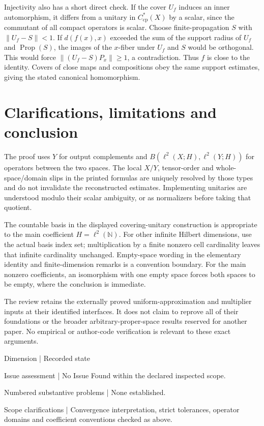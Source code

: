 \documentclass[10pt]{article}
\begin{document}
Injectivity also has a short direct check. If the cover \(U_f\) induces an inner automorphism, it differs from a unitary in \(C^*_{\mathrm{cp}}(X)\) by a scalar, since the commutant of all compact operators is scalar. Choose finite-propagation \(S\) with \(\|U_f-S\|<1\). If \(d(f(x),x)\) exceeded the sum of the support radius of \(U_f\) and \(\operatorname{Prop}(S)\), the images of the \(x\)-fiber under \(U_f\) and \(S\) would be orthogonal. This would force \(\|(U_f-S)P_x\|\ge1\), a contradiction. Thus \(f\) is close to the identity. Covers of close maps and compositions obey the same support estimates, giving the stated canonical homomorphism.\par
\section*{Clarifications, limitations and conclusion}
The proof uses \(Y\) for output complements and \(B(\ell^2(X;H),\ell^2(Y;H))\) for operators between the two spaces. The local \(X/Y\), tensor-order and whole-space/domain slips in the printed formulas are uniquely resolved by those types and do not invalidate the reconstructed estimates. Implementing unitaries are understood modulo their scalar ambiguity, or as normalizers before taking that quotient.\par
The countable basis in the displayed covering-unitary construction is appropriate to the main coefficient \(H=\ell^2(\mathbb N)\). For other infinite Hilbert dimensions, use the actual basis index set; multiplication by a finite nonzero cell cardinality leaves that infinite cardinality unchanged. Empty-space wording in the elementary identity and finite-dimension remarks is a convention boundary. For the main nonzero coefficients, an isomorphism with one empty space forces both spaces to be empty, where the conclusion is immediate.\par
The review retains the externally proved uniform-approximation and multiplier inputs at their identified interfaces. It does not claim to reprove all of their foundations or the broader arbitrary-proper-space results reserved for another paper. No empirical or author-code verification is relevant to these exact arguments.\par
Dimension | Recorded state\par
Issue assessment | No Issue Found within the declared inspected scope.\par
Numbered substantive problems | None established.\par
Scope clarifications | Convergence interpretation, strict tolerances, operator domains and coefficient conventions checked as above.\par
\end{document}
